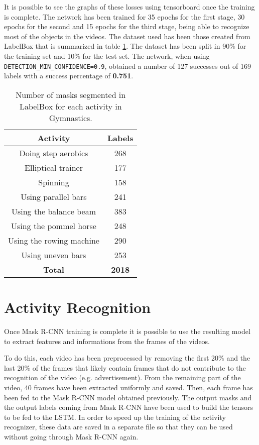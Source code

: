\documentclass[12pt]{article}
\numberwithin{equation}{section} %
\numberwithin{figure}{section} %
\numberwithin{table}{section} %
\theoremstyle{definition}
\begin{document}
It is possible to see the graphs of these losses using
tensorboard once the
training is complete. The network has been trained for 35
epochs for the first stage, 30 epochs for the second and
15 epochs for the third stage, being able to recognize most
of the objects in the videos. The dataset used has been those
created from LabelBox that is summarized in table
\ref{table:labelbox-masks-summary}. The dataset has been
split in 90\% for the training set and 10\% for the test set.
The network, when using \texttt{DETECTION\_MIN\_CONFIDENCE=0.9},
obtained a number of 127 successes out of 169
labels with a success percentage of \textbf{0.751}.

\begin{table}
	\centering
	\begin{tabular}{*{2}{c}}
		Activity & Labels \\
		\hline
		Doing step aerobics & 268 \\
		Elliptical trainer & 177 \\
		Spinning & 158 \\
		Using parallel bars & 241 \\
		Using the balance beam & 383 \\
		Using the pommel horse & 248 \\
		Using the rowing machine & 290 \\
		Using uneven bars & 253 \\
		\hline
		\textbf{Total} & \textbf{2018}
	\end{tabular}
	\caption{Number of masks segmented in LabelBox for
	    each activity in Gymnastics.}
	\label{table:labelbox-masks-summary}
\end{table}


\section{Activity Recognition}

Once Mask R-CNN training is complete it is possible to 
use the resulting model to extract features and informations
from the frames of the videos.

To do this, each video has been preprocessed by removing the
first 20\% and the last 20\% of the frames that likely contain
frames that do not contribute to the recognition of the video
(e.g. advertisement). From the remaining part of the video,
40 frames have been extracted uniformly and saved.
Then, each frame has been fed to the Mask R-CNN model obtained
previously. The output masks and the output labels coming
from Mask R-CNN have been
used to build the tensors to be fed to the LSTM. In order
to speed up the training of the activity recognizer, these
data are saved in a separate file so that they can be used 
without going through Mask R-CNN again.
\end{document}
